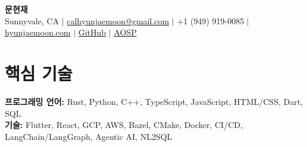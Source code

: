 \documentclass[10pt]{article}
\begin{document}
\begin{center}
    \textbf{\LARGE 문현재} \\ \vspace{2pt}
    \small Sunnyvale, CA $|$ \href{mailto:calhyunjaemoon@gmail.com}{calhyunjaemoon@gmail.com} $|$ +1 (949) 919-0085 $|$ \href{https://hyunjaemoon.com}{hyunjaemoon.com} $|$ \href{https://github.com/hyunjaemoon}{GitHub} $|$ \href{https://android-review.googlesource.com/q/owner:hyunjaemoon@google.com}{AOSP}
\end{center}
\vspace{-10pt}

\section{핵심 기술}
\begin{itemize}[leftmargin=0.15in, label={}, itemsep=0pt, parsep=0pt]
    \small{\item[]{
        \textbf{프로그래밍 언어:} Rust, Python, C++, TypeScript, JavaScript, HTML/CSS, Dart, SQL \\
        \textbf{기술:} Flutter, React, GCP, AWS, Bazel, CMake, Docker, CI/CD, LangChain/LangGraph, Agentic AI, NL2SQL
    }}
\end{itemize}

\end{document}
